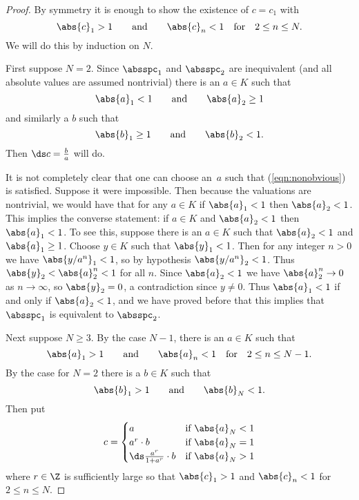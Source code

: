 \documentclass[11pt]{book}
\begin{document}
\begin{ch}
\begin{proof}
By symmetry it is enough to show the existence of $c=c_1$ with
$$
  \abs{c}_1 > 1 \qquad \text{and} \qquad \abs{c}_n<1 \quad
\text{for} \quad 2\leq n\leq N.
$$
We will do this by induction on $N$.

First suppose $N=2$.  Since $\absspc_1$ and $\absspc_2$ are
inequivalent (and all absolute values are assumed nontrivial)
there is an $a\in K$ such that
\begin{equation}\label{eqn:nonobvious}
  \abs{a}_1 < 1\qquad \text{and}\qquad \abs{a}_2 \geq 1
\end{equation}
and similarly a $b$ such that
$$
  \abs{b}_1 \geq 1\qquad \text{and}\qquad \abs{b}_2 < 1.
$$
Then $\ds c=\frac{b}{a}$ will do.

\begin{remark}
  It is not completely clear that
  one can choose an~$a$ such that (\ref{eqn:nonobvious}) is satisfied.
  Suppose it were impossible.  Then because the valuations are
  nontrivial, we would have that for any $a\in K$ if $\abs{a}_1<1$
  then $\abs{a}_2<1$.  This implies the converse statement: if $a\in
  K$ and $\abs{a}_2<1$ then $\abs{a}_1<1$.  To see this, suppose there
  is an $a\in K$ such that $\abs{a}_2<1$ and $\abs{a}_1\geq 1$.
  Choose $y\in K$ such that $\abs{y}_1<1$.  Then for any integer $n>0$
  we have $\abs{y/a^n}_1<1$, so by hypothesis $\abs{y/a^n}_2<1$.  Thus
  $\abs{y}_2 < \abs{a}_2^n < 1$ for all $n$.  Since $\abs{a}_2<1$ we
  have $\abs{a}_2^n\to 0$ as $n\to\infty$, so $\abs{y}_2=0$, a
  contradiction since $y\neq 0$.  Thus $\abs{a}_1<1$ if and only if
  $\abs{a}_2<1$, and we have proved before that this implies that
  $\absspc_1$ is equivalent to $\absspc_2$.
\end{remark}


Next suppose $N\geq 3$.  By the case $N-1$, there is an $a\in K$ such
that
$$
  \abs{a}_1 > 1 \qquad \text{and} \qquad \abs{a}_n<1 \quad
\text{for} \quad 2\leq n\leq N-1.
$$
By the case for $N=2$ there is a $b\in K$ such that
$$
   \abs{b}_1>1 \qquad\text{and}\qquad\abs{b}_N<1.
$$
Then put
$$
c = \begin{cases}
  a & \text{if } \abs{a}_N<1\\
  a^r\cdot b & \text{if } \abs{a}_N=1\\
  {\ds\frac{a^r}{1+a^r}}\cdot b & \text{if }\abs{a}_N>1
\end{cases}
$$
where $r\in\Z$ is sufficiently large so that
$\abs{c}_1>1$ and $\abs{c}_n<1$ for $2\leq n\leq N$.
\end{proof}


\end{ch}
\end{document}
